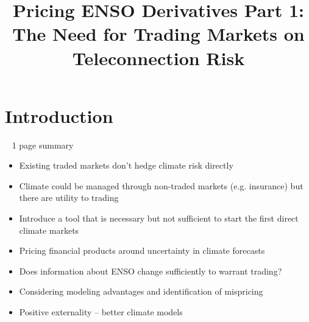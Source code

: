 \documentclass[authoryear]{article}
\begin{document}
\title{Pricing ENSO Derivatives Part 1: The Need for Trading Markets on Teleconnection Risk}
\date{}  %
%
%
%
%
%


\maketitle%


\section{Introduction}



~ 1 page summary

\begin{itemize}
\item Existing traded markets don't hedge climate risk directly
\item Climate could be managed through non-traded markets (e.g. insurance) but there are utility to trading
\end{itemize}

\begin{itemize}
\item Introduce a tool that is necessary but not sufficient to start the first direct climate markets
\item Pricing financial products around uncertainty in climate forecasts
\item Does information about ENSO change sufficiently to warrant trading?
\item Considering modeling advantages and identification of mispricing
\item Positive externality – better climate models
\end{itemize}
\end{document}
